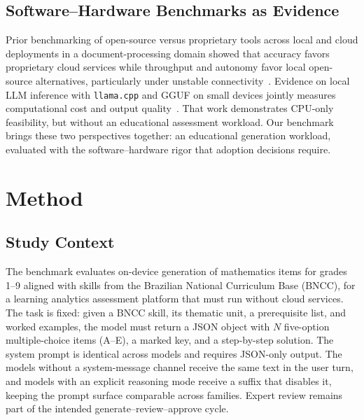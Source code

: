 \documentclass[fleqn,10pt]{JLA_article}
\begin{document}
\subsection{Software--Hardware Benchmarks as Evidence}
Prior benchmarking of open-source versus proprietary tools across local and cloud deployments in a document-processing domain showed that accuracy favors proprietary cloud services while throughput and autonomy favor local open-source alternatives, particularly under unstable connectivity~\autocite{sarmanho2026ocr}. Evidence on local LLM inference with \texttt{llama.cpp} and GGUF on small devices jointly measures computational cost and output quality~\autocite{monteiro2025smalldevice}. That work demonstrates CPU-only feasibility, but without an educational assessment workload. Our benchmark brings these two perspectives together: an educational generation workload, evaluated with the software--hardware rigor that adoption decisions require.
\section{Method}
\subsection{Study Context}
The benchmark evaluates on-device generation of mathematics items for grades 1--9 aligned with skills from the Brazilian National Curriculum Base (BNCC), for a learning analytics assessment platform that must run without cloud services. The task is fixed: given a BNCC skill, its thematic unit, a prerequisite list, and worked examples, the model must return a JSON object with $N$ five-option multiple-choice items (A--E), a marked key, and a step-by-step solution. The system prompt is identical across models and requires JSON-only output. The models without a system-message channel receive the same text in the user turn, and models with an explicit reasoning mode receive a suffix that disables it, keeping the prompt surface comparable across families. Expert review remains part of the intended generate--review--approve cycle.
\end{document}

